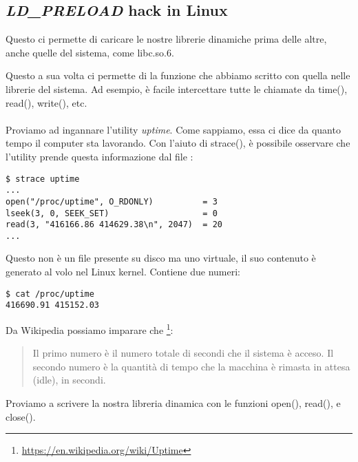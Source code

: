 \subsection{\emph{LD\_PRELOAD} hack in Linux}

\label{ld_preload}

Questo ci permette di caricare le nostre librerie dinamiche prima delle altre, anche quelle del sistema, come libc.so.6.

Questo a sua volta ci permette di  la funzione che abbiamo scritto con quella nelle librerie del sistema.
Ad esempio, è facile intercettare tutte le chiamate da  
time(), read(), write(), etc. \\
\\
Proviamo ad ingannare l'utility \emph{uptime}.
Come sappiamo, essa ci dice da quanto tempo il computer sta lavorando.
Con l'aiuto di strace(), è possibile osservare che l'utility prende questa informazione dal file :

\begin{lstlisting}
$ strace uptime 
...
open("/proc/uptime", O_RDONLY)          = 3
lseek(3, 0, SEEK_SET)                   = 0
read(3, "416166.86 414629.38\n", 2047)  = 20
...
\end{lstlisting}

Questo non è un file presente su disco ma uno virtuale, il suo contenuto è generato al volo nel Linux kernel.
Contiene due numeri:

\begin{lstlisting}
$ cat /proc/uptime
416690.91 415152.03
\end{lstlisting}

Da Wikipedia possiamo imparare che
\footnote{\url{https://en.wikipedia.org/wiki/Uptime}}:

\begin{framed}
\begin{quotation}
Il primo numero è il numero totale di secondi che il sistema è acceso.
Il secondo numero è la quantità di tempo che la macchina è rimasta in attesa (idle), in secondi.
\end{quotation}
\end{framed}


Proviamo a scrivere la nostra libreria dinamica con le funzioni open(), read(), e close().

